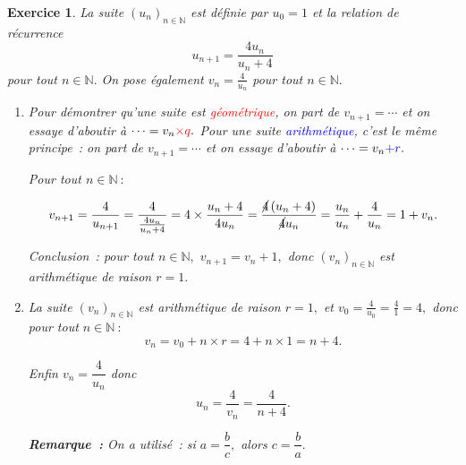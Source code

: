 \documentclass[10pt]{article}
\newtheorem{exo}{Exercice}
\begin{document}
\begin{exo}

La suite $(u_n)_{n\in\mathbb{N}}$ est définie par $u_0=1$ et la relation de récurrence \[u_{n+1}=\frac{4u_n}{u_n+4}\] pour tout $n\in\mathbb{N}.$ On pose également $v_n=\frac{4}{u_n}$ pour tout $n\in\mathbb{N}.$


\begin{enumerate}
\item Pour démontrer qu'une suite est \textcolor{red}{géométrique}, on part de $v_{n+1}=\cdots$ et on essaye d'aboutir à $\cdots =v_n\textcolor{red}{\times q}.$ Pour une suite \textcolor{blue}{arithmétique}, c'est le même principe~: on part de $v_{n+1}=\cdots$ et on essaye d'aboutir à $\cdots =v_n \textcolor{blue}{+r}.$

\medskip

Pour tout $n\in\mathbb{N}~:$

\[
v_{n+1}=\dfrac{4}{u_{n+1}}=\dfrac{4}{\frac{4u_n}{u_n+4}}=4\times \dfrac{u_n+4}{4u_n}=\dfrac{\cancel{4}\left(u_n+4\right)}{\cancel{4}u_n}=\dfrac{u_n}{u_n}+\dfrac{4}{u_n}=1+v_n.
\]


Conclusion~: pour tout $n\in\mathbb{N},$ $v_{n+1}=v_n+1,$
donc $(v_n)_{n\in\mathbb{N}}$ est arithmétique de raison $r=1.$



\item La suite $(v_n)_{n\in\mathbb{N}}$ est arithmétique de raison $r=1,$ et  $v_0=\frac{4}{u_0}=\frac{4}{1}=4,$ donc pour tout $n\in\mathbb{N}~:$
\[v_n=v_0+n\times r=4+n\times 1=n+4.\]


Enfin $v_n=\dfrac{4}{u_{n}}$ donc
\[u_n=\dfrac{4}{v_{n}}=\dfrac{4}{n+4}.\]

\medskip

\textbf{Remarque~:} On a utilisé~: si $a=\dfrac{b}{c},$ alors $c=\dfrac{b}{a}.$
\end{enumerate}

\end{exo}
\end{document}
